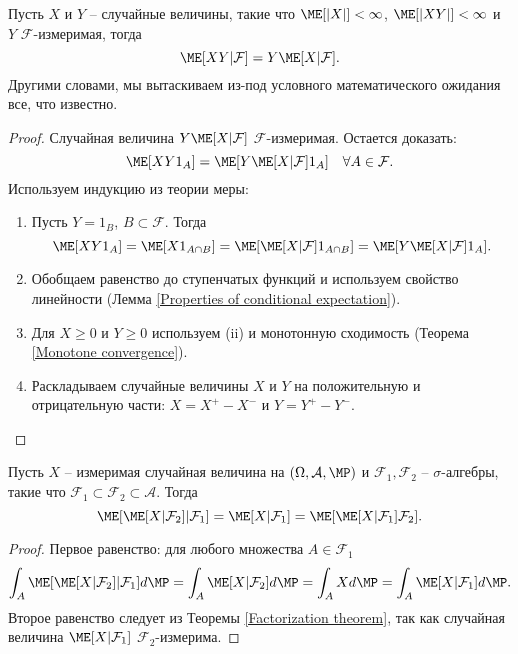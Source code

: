 \begin{thm} \label{Factorization theorem}
	Пусть $X$ и $Y$  -- случайные величины, такие что $\ME[|X|]<\infty$, $\ME[|XY|]<\infty$ и $Y$ $\mathcal{F}$-измеримая, тогда
	\[ \ME[XY | \mathcal{F}]=Y\ME[X|\mathcal{F}].  \]
	Другими словами, мы вытаскиваем из-под условного математического ожидания все, что известно.
\end{thm}

\begin{proof}
	Случайная величина $Y\ME[X|\mathcal{F}]$ $\mathcal{F}$-измеримая. Остается доказать:
	\[\ME[XY1_A]=\ME[Y\ME[X|\mathcal{F}]1_A] \quad \forall A \in \mathcal{F}. \]	
	Используем индукцию из теории меры:
	\begin{enumerate}
		\item Пусть $Y=1_B$, $B \subset \mathcal{F}$. Тогда
		\[ \ME[XY1_A] = \ME[X1_{A \cap  B}] = \ME[\ME[X|\mathcal{F}]1_{A \cap  B}]=\ME[Y\ME[X|\mathcal{F}]1_A]. \]
		\item Обобщаем равенство до ступенчатых функций и используем свойство линейности (Лемма \ref{Properties of conditional expectation}).
		\item Для $X \geq 0$ и $Y \geq 0$ используем (ii) и монотонную сходимость (Теорема \ref{Monotone convergence}).
		\item Раскладываем случайные величины $X$ и $Y$ на положительную и отрицательную части: $X=X^+-X^-$ и $Y=Y^+-Y^-$.
	\end{enumerate}
\end{proof}

\begin{thm}  \label{Tower property}
	Пусть $X$ -- измеримая случайная величина на $(\Omega, \mathcal{A}, \MP)$ и $\mathcal{F}_1, \mathcal{F}_2$ -- $\sigma$-алгебры, такие что $\mathcal{F}_1 \subset \mathcal{F}_2 \subset \mathcal{A}$. Тогда
	\[ \ME[\ME[X|\mathcal{F}_2]|\mathcal{F}_1] = \ME[X|\mathcal{F}_1]=\ME[\ME[X|\mathcal{F}_1]\mathcal{F}_2]. \]
\end{thm}
	
\begin{proof}
	Первое равенство: для любого множества $A \in \mathcal{F}_1$
	\[ \int_{A}\ME[\ME[X|\mathcal{F}_2]|\mathcal{F}_1] d\MP = \int_A \ME[X|\mathcal{F}_2] d\MP=\int_AXd\MP=\int_A\ME[X|\mathcal{F}_1]d\MP. \]
	Второе равенство следует из Теоремы \ref{Factorization theorem}, так как случайная величина $\ME[X|\mathcal{F}_1]$ $\mathcal{F}_2$-измерима.
\end{proof}

